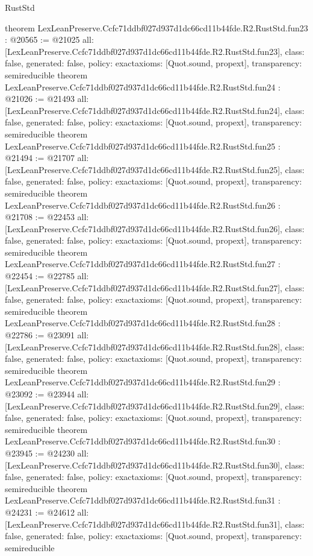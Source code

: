 \begin{lexlean}{RustStd}
\begin{coremodule}
{}
theorem LexLeanPreserve.Ccfc71ddbf027d937d1dc66cd11b44fde.R2.RustStd.fun23 : @20565 := @21025 {
  all: [LexLeanPreserve.Ccfc71ddbf027d937d1dc66cd11b44fde.R2.RustStd.fun23],
  class: false,
  generated: false,
  policy: exact{axioms: [Quot.sound, propext]},
  transparency: semireducible
}
theorem LexLeanPreserve.Ccfc71ddbf027d937d1dc66cd11b44fde.R2.RustStd.fun24 : @21026 := @21493 {
  all: [LexLeanPreserve.Ccfc71ddbf027d937d1dc66cd11b44fde.R2.RustStd.fun24],
  class: false,
  generated: false,
  policy: exact{axioms: [Quot.sound, propext]},
  transparency: semireducible
}
theorem LexLeanPreserve.Ccfc71ddbf027d937d1dc66cd11b44fde.R2.RustStd.fun25 : @21494 := @21707 {
  all: [LexLeanPreserve.Ccfc71ddbf027d937d1dc66cd11b44fde.R2.RustStd.fun25],
  class: false,
  generated: false,
  policy: exact{axioms: [Quot.sound, propext]},
  transparency: semireducible
}
theorem LexLeanPreserve.Ccfc71ddbf027d937d1dc66cd11b44fde.R2.RustStd.fun26 : @21708 := @22453 {
  all: [LexLeanPreserve.Ccfc71ddbf027d937d1dc66cd11b44fde.R2.RustStd.fun26],
  class: false,
  generated: false,
  policy: exact{axioms: [Quot.sound, propext]},
  transparency: semireducible
}
theorem LexLeanPreserve.Ccfc71ddbf027d937d1dc66cd11b44fde.R2.RustStd.fun27 : @22454 := @22785 {
  all: [LexLeanPreserve.Ccfc71ddbf027d937d1dc66cd11b44fde.R2.RustStd.fun27],
  class: false,
  generated: false,
  policy: exact{axioms: [Quot.sound, propext]},
  transparency: semireducible
}
theorem LexLeanPreserve.Ccfc71ddbf027d937d1dc66cd11b44fde.R2.RustStd.fun28 : @22786 := @23091 {
  all: [LexLeanPreserve.Ccfc71ddbf027d937d1dc66cd11b44fde.R2.RustStd.fun28],
  class: false,
  generated: false,
  policy: exact{axioms: [Quot.sound, propext]},
  transparency: semireducible
}
theorem LexLeanPreserve.Ccfc71ddbf027d937d1dc66cd11b44fde.R2.RustStd.fun29 : @23092 := @23944 {
  all: [LexLeanPreserve.Ccfc71ddbf027d937d1dc66cd11b44fde.R2.RustStd.fun29],
  class: false,
  generated: false,
  policy: exact{axioms: [Quot.sound, propext]},
  transparency: semireducible
}
theorem LexLeanPreserve.Ccfc71ddbf027d937d1dc66cd11b44fde.R2.RustStd.fun30 : @23945 := @24230 {
  all: [LexLeanPreserve.Ccfc71ddbf027d937d1dc66cd11b44fde.R2.RustStd.fun30],
  class: false,
  generated: false,
  policy: exact{axioms: [Quot.sound, propext]},
  transparency: semireducible
}
theorem LexLeanPreserve.Ccfc71ddbf027d937d1dc66cd11b44fde.R2.RustStd.fun31 : @24231 := @24612 {
  all: [LexLeanPreserve.Ccfc71ddbf027d937d1dc66cd11b44fde.R2.RustStd.fun31],
  class: false,
  generated: false,
  policy: exact{axioms: [Quot.sound, propext]},
  transparency: semireducible
}
\end{coremodule}
\end{lexlean}
